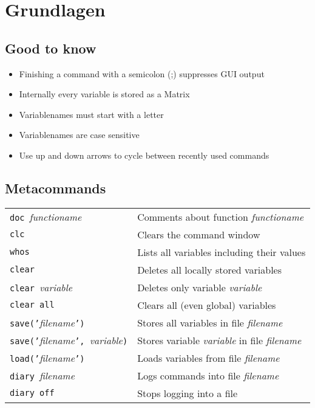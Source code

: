 \section{Grundlagen}
\subsection{Good to know}
\begin{itemize}
 \item Finishing a command with a semicolon (;) suppresses GUI output
 \item Internally every variable is stored as a Matrix
 \item Variablenames must start with a letter
 \item Variablenames are case sensitive
 \item Use up and down arrows to cycle between recently used commands
\end{itemize}

\subsection{Metacommands}
\begin{tabular}{@{}p{\the\MyLenA}%
		@{}p{\linewidth-\the\MyLenA}}
  \texttt{doc}~\textit{functioname} & Comments about function \textit{functioname}\\
  \texttt{clc}& Clears the command window\\
  \texttt{whos}& Lists all variables including their values\\
  \texttt{clear} & Deletes all locally stored variables\\
  \texttt{clear}~\textit{variable} & Deletes only variable \textit{variable}\\
  \texttt{clear all}& Clears all (even global) variables\\
  \texttt{save('}\textit{filename}\texttt{')} & Stores all variables in file \textit{filename}\\
  \texttt{save('}\textit{filename}\texttt{', }\textit{variable}\texttt{)} & Stores variable \textit{variable} in file \textit{filename}\\ 
  \texttt{load('}\textit{filename}\texttt{')} & Loads variables from file \textit{filename}\\
  \texttt{diary}~\textit{filename}& Logs commands into file \textit{filename}\\
  \texttt{diary off} & Stops logging into a file\\
\end{tabular}

